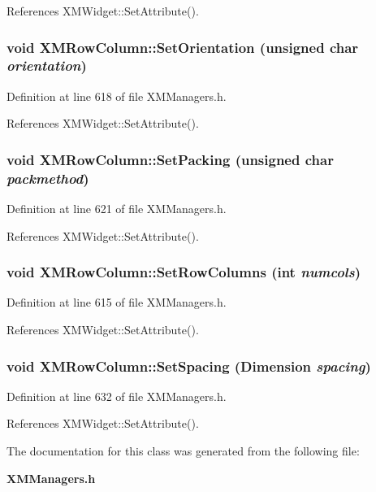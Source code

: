 References XMWidget::Set\-Attribute().
\subsubsection{\setlength{\rightskip}{0pt plus 5cm}void XMRow\-Column::Set\-Orientation (unsigned char {\em orientation})\hspace{0.3cm}{\tt  [inline]}}\label{classXMRowColumn_a11}




Definition at line 618 of file XMManagers.h.

References XMWidget::Set\-Attribute().
\subsubsection{\setlength{\rightskip}{0pt plus 5cm}void XMRow\-Column::Set\-Packing (unsigned char {\em packmethod})\hspace{0.3cm}{\tt  [inline]}}\label{classXMRowColumn_a12}




Definition at line 621 of file XMManagers.h.

References XMWidget::Set\-Attribute().
\subsubsection{\setlength{\rightskip}{0pt plus 5cm}void XMRow\-Column::Set\-Row\-Columns (int {\em numcols})\hspace{0.3cm}{\tt  [inline]}}\label{classXMRowColumn_a10}




Definition at line 615 of file XMManagers.h.

References XMWidget::Set\-Attribute().
\subsubsection{\setlength{\rightskip}{0pt plus 5cm}void XMRow\-Column::Set\-Spacing (Dimension {\em spacing})\hspace{0.3cm}{\tt  [inline]}}\label{classXMRowColumn_a17}




Definition at line 632 of file XMManagers.h.

References XMWidget::Set\-Attribute().

The documentation for this class was generated from the following file:\begin{CompactItemize}
\item 
{\bf XMManagers.h}\end{CompactItemize}
